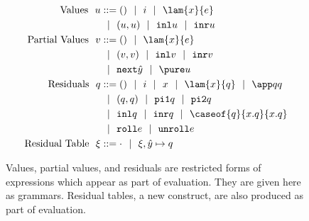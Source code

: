 
\begin{figure}
\begin{abstrsyn}
\[\begin{aligned}
\text{Values}\ \ 
u &::= ()\gbar\inte
 \gbar \lam {\var}{e} \\
&\gbar (u, u)
 \gbar \inl u 
 \gbar \inr u \\
\text{Partial Values}\ \ 
v &::= ()
 \gbar \lam {\var}{\expr} \\
&\gbar (v, v)
 \gbar \inl v 
 \gbar \inr v \\
&\gbar \next {\hat y}
 \gbar \pure u \\
\text{Residuals}\ \ 
q &::= ()\gbar\inte\gbar\var%
 \gbar \lam {\var}{q} 
 \gbar \app q q \\
&\gbar (q, q) 
 \gbar \pio q 
 \gbar \pit q \\
&\gbar \inl q 
 \gbar \inr q
 \gbar \caseof {q}{\var.q}{\var.q} \\
&\gbar \roll e
 \gbar \unroll e\\
\text{Residual Table}\ \ 
\xi &::= \cdot
 \gbar \xi, {\hat y} \mapsto q \\
\end{aligned}\]
\end{abstrsyn}
\caption{Values, partial values, and residuals are restricted forms of expressions
which appear as part of evaluation.
They are given here as grammars.  
Residual tables, a new construct, are also produced as part of evaluation.}
\end{figure}

